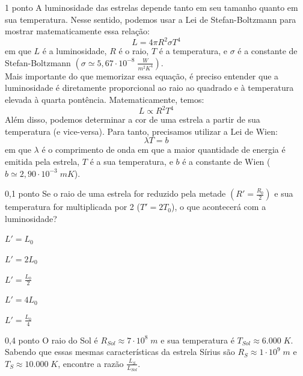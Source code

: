\documentclass{../lista}
\begin{document}
	\begin{questao}{1 ponto}
		A luminosidade das estrelas depende tanto em seu tamanho quanto em sua temperatura. Nesse sentido, podemos usar a Lei de Stefan-Boltzmann para mostrar matematicamente essa relação:
		\begin{equation}
			L=4 \pi R^2 \sigma T^4
		\end{equation}
		em que $L$ é a luminosidade, $R$ é o raio, $T$ é a temperatura, e $\sigma$ é a constante de Stefan-Boltzmann $\left( \sigma \simeq 5,67 \cdot 10^{-8} \; \frac{W}{m^2K^4} \right)$. \\
		Mais importante do que memorizar essa equação, é preciso entender que a luminosidade é diretamente proporcional ao raio ao quadrado e à temperatura elevada à quarta pontência. Matematicamente, temos:
		\begin{equation}
			L \propto R^2 T^4
		\end{equation}
		Além disso, podemos determinar a cor de uma estrela a partir de sua temperatura (e vice-versa). Para tanto, precisamos utilizar a Lei de Wien:
		\begin{equation}
			\lambda T = b
		\end{equation}
		em que $\lambda$ é o comprimento de onda em que a maior quantidade de energia é emitida pela estrela, $T$ é a sua temperatura, e $b$ é a constante de Wien ($b \simeq 2,90 \cdot 10^{-3} \; mK$).

		\begin{pergunta}{0,1 ponto}
			Se o raio de uma estrela for reduzido pela metade $\left( R'=\frac{R_0}{2} \right)$ e sua temperatura for multiplicada por 2 ($T'=2T_0$), o que acontecerá com a luminosidade?

			\begin{alternativas}
				\item $L'=L_0$
				\item $L'=2L_0$
				\item $L'=\frac{L_0}{2}$
				\item $L'=4L_0$
				\item $L'=\frac{L_0}{4}$
			\end{alternativas}
		\end{pergunta}

		\begin{pergunta}{0,4 ponto}
			O raio do Sol é $R_{Sol} \approx 7 \cdot 10^8 \; m$ e sua temperatura é $T_{Sol} \approx 6.000 \; K$. Sabendo que essas mesmas características da estrela Sírius são $R_S \approx 1 \cdot 10^9 \; m$ e $T_S \approx 10.000 \; K$, encontre a razão $\frac{L_S}{L_{Sol}}$.


\end{pergunta}
\end{questao}
\end{document}
